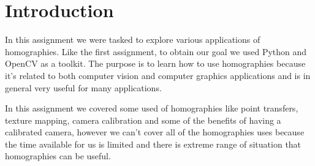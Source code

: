 \section{Introduction}

In this assignment we were tasked to explore various applications of homographies. Like the first assignment, to obtain our goal we used Python and OpenCV as a toolkit. The purpose is to learn how to use homographies because it’s related to both computer vision and computer graphics applications and is in general very useful for many applications. 

In this assignment we covered some used of homographies like point transfers, texture mapping, camera calibration and some of the beneﬁts of having a calibrated camera, however we can’t cover all of the homographies uses because the time available for us is limited and there is extreme range of situation that homographies can be useful.


